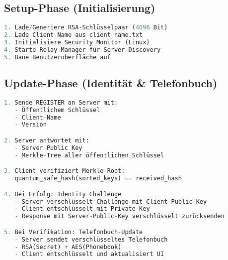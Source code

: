 \documentclass[10pt,a4paper]{article}
\begin{document}
\subsection{Setup-Phase (Initialisierung)}
\begin{lstlisting}[language=Python,caption=Client-Initialisierung]
1. Lade/Generiere RSA-Schlüsselpaar (4096 Bit)
2. Lade Client-Name aus client_name.txt
3. Initialisiere Security Monitor (Linux)
4. Starte Relay-Manager für Server-Discovery
5. Baue Benutzeroberfläche auf
\end{lstlisting}

\subsection{Update-Phase (Identität \& Telefonbuch)}
\begin{lstlisting}[language=Python,caption=Registrierung und Update]
1. Sende REGISTER an Server mit:
   - Öffentlichem Schlüssel
   - Client-Name
   - Version

2. Server antwortet mit:
   - Server Public Key
   - Merkle-Tree aller öffentlichen Schlüssel

3. Client verifiziert Merkle-Root:
   quantum_safe_hash(sorted_keys) == received_hash

4. Bei Erfolg: Identity Challenge
   - Server verschlüsselt Challenge mit Client-Public-Key
   - Client entschlüsselt mit Private-Key
   - Response mit Server-Public-Key verschlüsselt zurücksenden

5. Bei Verifikation: Telefonbuch-Update
   - Server sendet verschlüsseltes Telefonbuch
   - RSA(Secret) + AES(Phonebook)
   - Client entschlüsselt und aktualisiert UI
\end{lstlisting}
\end{document}
